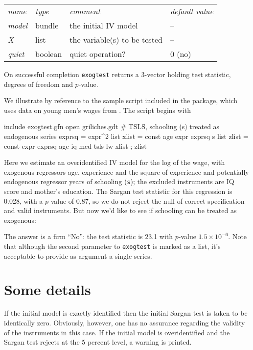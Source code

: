\documentclass{article}
\begin{document}
\begin{center}
\begin{tabular}{llll}
\textit{name}  & \textit{type} & \textit{comment} & \textit{default value} \\[4pt]
\textsl{model} & bundle & the initial IV model & --  \\ 
\textsl{X}     & list & the variable(s) to be tested &  -- \\
\textsl{quiet} & boolean & quiet operation? & 0 (no)
\end{tabular}
\end{center}

On successful completion \texttt{exogtest} returns a 3-vector holding
test statistic, degrees of freedom and $p$-value.

We illustrate by reference to the sample script included in the
package, which uses data on young men's wages from
\cite{griliches76}. The script begins with
%
\begin{code}
include exogtest.gfn
open griliches.gdt
# TSLS, schooling (s) treated as endogenous
series exprsq = expr^2
list xlist = const age expr exprsq s
list zlist = const expr exprsq age iq med
tsls lw xlist ; zlist
\end{code}
%
Here we estimate an overidentified IV model for the log of the wage,
with exogenous regressors age, experience and the square of experience
and potentially endogenous regressor years of schooling (\texttt{s});
the excluded instruments are IQ score and mother's education. The
Sargan test statistic for this regression is 0.028, with a $p$-value
of 0.87, so we do not reject the null of correct specification and
valid instruments. But now we'd like to see if schooling can be
treated as exogenous:
%
The answer is a firm ``No'': the test statistic is 23.1 with $p$-value
$1.5^{-6}$. Note that although the second parameter to
\texttt{exogtest} is marked as a list, it's acceptable to provide as
argument a single series.

\section{Some details}

If the initial model is exactly identified then the initial Sargan
test is taken to be identically zero. Obviously, however, one has
no assurance regarding the validity of the instruments in this case.
If the initial model is overidentified and the Sargan test rejects at
the 5 percent level, a warning is printed.
\end{document}

